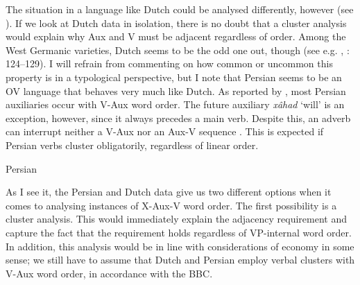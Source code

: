 \documentclass[output=paper, colorlinks, citecolor=brown]{langscibook}
\begin{document}
The situation in a language like Dutch could be analysed differently, however (see ). If we look at Dutch data in isolation, there is no doubt that a cluster analysis would explain why Aux and V must be adjacent regardless of order. Among the West Germanic varieties, Dutch seems to be the odd one out, though (see e.g. \citealt{Haegeman1992}, \citealt{Sapp2011}: 124–129). I will refrain from commenting on how common or uncommon this property is in a typological perspective, but I note that Persian seems to be an OV language that behaves very much like Dutch. As reported by \citet[100]{Sheehan2017Final}, most Persian auxiliaries occur with V-Aux word order. The future auxiliary \textit{xâhad} ‘will’ is an exception, however, since it always precedes a main verb. Despite this, an adverb can interrupt neither a V-Aux  nor an Aux-V sequence . This is expected if Persian verbs cluster obligatorily, regardless of linear order.

\ea Persian
\label{ex:sangfelt:32}

\z 
\z


As I see it, the Persian and Dutch data give us two different options when it comes to analysing instances of X-Aux-V word order. The first possibility is a cluster analysis. This would immediately explain the adjacency requirement and capture the fact that the requirement holds regardless of VP-internal word order. In addition, this analysis would be in line with considerations of economy in some sense; we still have to assume that Dutch and Persian employ verbal clusters with V-Aux word order, in accordance with the BBC. 
\end{document}
